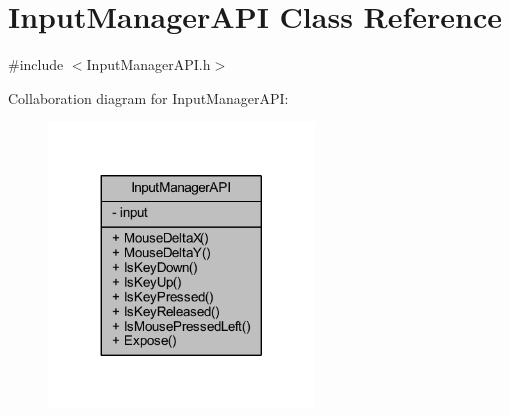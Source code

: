 \hypertarget{class_input_manager_a_p_i}{}\section{Input\+Manager\+A\+PI Class Reference}
\label{class_input_manager_a_p_i}


{\ttfamily \#include $<$Input\+Manager\+A\+P\+I.\+h$>$}



Collaboration diagram for Input\+Manager\+A\+PI\+:\nopagebreak
\begin{figure}[H]
\begin{center}
\leavevmode
\includegraphics[width=200pt]{class_input_manager_a_p_i__coll__graph}
\end{center}
\end{figure}
